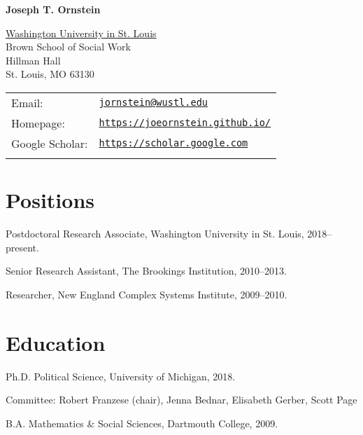 \documentclass[letterpaper]{article}
\def\name{Joseph T. Ornstein}
\renewenvironment{itemize}{
  \begin{list}{}{
    \setlength{\leftmargin}{1.5em}
  }
}{
  \end{list}
}
\begin{document}

\centerline{\huge \bf \name}

\vspace{0.25in}

\begin{minipage}{0.45\linewidth}
  \href{https://wustl.edu/}{Washington University in St. Louis} \\
  Brown School of Social Work \\
  Hillman Hall \\
  St. Louis, MO 63130\\
\end{minipage}
\begin{minipage}{0.45\linewidth}
  \begin{tabular}{ll}
    Email: & \href{mailto:jornstein@wustl.edu}{\tt jornstein@wustl.edu} \\
    Homepage: & \href{https://joeornstein.github.io/}{\tt https://joeornstein.github.io/} \\ 
    Google Scholar: & \href{https://scholar.google.com/citations?user=HXC86u8AAAAJ&hl=en}{\tt https://scholar.google.com} \\
    &\\
  \end{tabular}
\end{minipage}

\hrulefill

\section*{Positions}

\begin{itemize}
\item Postdoctoral Research Associate, Washington University in St. Louis, 2018--present.
\item Senior Research Assistant, The Brookings Institution, 2010--2013.
\item Researcher, New England Complex Systems Institute, 2009--2010.
\end{itemize}


\hrulefill

\section*{Education}

\begin{itemize}
  \item Ph.D. Political Science, University of Michigan, 2018.
  	\begin{itemize}
  	\item Committee: Robert Franzese (chair), Jenna Bednar, Elisabeth Gerber, Scott Page
  	\end{itemize}

  \item B.A. Mathematics \& Social Sciences, Dartmouth College, 2009.

  
\end{itemize}
\end{document}
